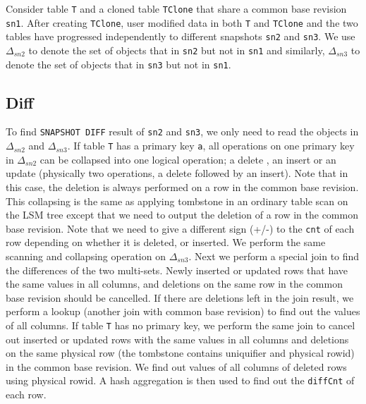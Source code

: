 \documentclass[sigconf,nonacm]{acmart} %
\begin{document}
Consider table \texttt{T} and a cloned table \texttt{TClone} that share a 
common base revision \texttt{sn1}.  After creating \texttt{TClone}, user modified 
data in both \texttt{T} and \texttt{TClone} and the two tables have progressed 
independently to different snapshots \texttt{sn2} and \texttt{sn3}.  We use 
$\Delta_{sn2}$ to denote the set of objects that in \texttt{sn2} but not in \texttt{sn1}
and similarly, $\Delta_{sn3}$ to denote the set of objects that in \texttt{sn3} but 
not in \texttt{sn1}.

\subsection{Diff}
To find \texttt{SNAPSHOT DIFF} result of \texttt{sn2} and \texttt{sn3}, we only need to
read the objects in $\Delta_{sn2}$ and $\Delta_{sn3}$.  
If table \texttt{T} has a primary key \texttt{a},
all operations on one primary key in $\Delta_{sn2}$ can be collapsed into one logical operation; 
a delete , an insert or an update (physically two operations, a delete followed by an insert).
Note that in this case, the deletion is always performed on a row in the common base revision.
This collapsing is the same as applying tombstone in 
an ordinary table scan on the LSM tree except that we need to output the deletion of a 
row in the common base revision.  Note that we need to give a different sign (+/-) to 
the \texttt{cnt} of each row depending on whether it is deleted, or inserted. 
We perform the same scanning and collapsing operation on $\Delta_{sn3}$.  
Next we perform a special join to find the differences of the two multi-sets.
Newly inserted or updated rows that have the same values in all columns, and
deletions on the same row in the common base revision should be cancelled.  
If there are deletions left in the join result, we perform a lookup (another join with
common base revision) to find out the values of all columns.
If table \texttt{T} has no primary key, we perform the same join to cancel out 
inserted or updated rows with the same values in all columns and deletions on the same 
physical row (the tombstone contains uniquifier and physical rowid) in the common 
base revision.  We find out values of all columns of deleted rows using physical rowid. 
A hash aggregation is then used to find out the \texttt{diffCnt} of each row.
\end{document}
